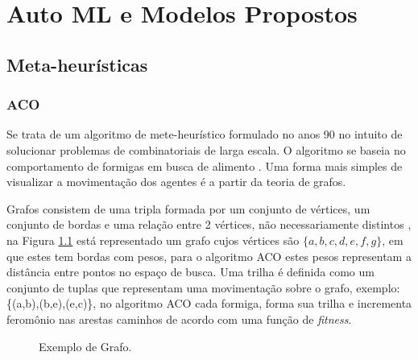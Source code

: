 \chapter{Auto ML e Modelos Propostos}
\label{cap:auto_ml}

\section{Meta-heurísticas}

\subsection{ACO}
\label{subsec:aco}

Se trata de um algoritmo de mete-heurístico formulado no anos 90 \cite{dorigo1999ant} no intuito de solucionar problemas de combinatoriais de larga escala. O algoritmo se baseia no comportamento de formigas em busca de alimento \cite{dorigo2006ant}. Uma forma mais simples de visualizar a movimentação dos agentes é a partir da teoria de grafos.

Grafos consistem de uma tripla formada por um conjunto de vértices, um conjunto de bordas e uma relação entre 2 vértices, não necessariamente distintos \cite{west2001introduction}, na Figura \ref{fig:cap3_graph_example} está representado um grafo cujos vértices são $\{a, b, c, d, e, f, g\}$, em que estes tem bordas com pesos, para o algoritmo ACO estes pesos representam a distância entre pontos no espaço de busca. Uma trilha é definida como um conjunto de tuplas que representam uma movimentação sobre o grafo, exemplo: \{(a,b),(b,e),(e,c)\}, no algoritmo ACO cada formiga, forma sua trilha e incrementa feromônio nas arestas caminhos de acordo com uma função de \textit{fitness}. 

\begin{figure}
\centering
\caption{Exemplo de Grafo.}
\label{fig:cap3_graph_example}
\end{figure}

